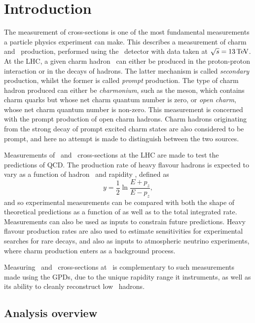 \chapter{Introduction}
\label{chap:prod:introduction}

The measurement of cross-sections is one of the most fundamental measurements a 
particle physics experiment can make.
This  describes a measurement of charm and \ccbar\ 
production, performed using the \lhcb\ detector with data taken at $\sqrts = 
\SI{13}{\TeV}$.
At the \ac{LHC}, a given charm hadron \PHc\ can either be produced in the 
proton-proton interaction or in the decays of \PB hadrons.
The latter mechanism is called \emph{secondary} production, whilst the former is called \emph{prompt} production.
The type of charm hadron produced can either be \emph{charmonium}, such as the 
\PJpsi meson, which contains charm quarks but whose net charm quantum number is 
zero, or \emph{open charm}, whose net charm quantum number is non-zero.
This measurement is concerned with the prompt production of open charm hadrons.
Charm hadrons originating from the strong decay of prompt excited charm states 
are also considered to be prompt, and here no attempt is made to distinguish 
between the two sources.

Measurements of \ccbar\ and \bbbar\ cross-sections at the \ac{LHC} are made to 
test the predictions of \acf{QCD}.
The production rate of heavy flavour hadrons is expected to vary as a function 
of hadron \pT\ and rapidity \rapidity, defined as
\begin{equation}
  y = \frac{1}{2}\ln{\frac{E + p_{z}}{E - p_{z}}},
  \label{eqn:prod:introduction:rapidity}
\end{equation}
and so experimental measurements can be compared with both the shape of 
theoretical predictions as a function of \pTy as well as to the total 
integrated rate.
Measurements can also be used as inputs to constrain future predictions.
Heavy flavour production rates are also used to estimate sensitivities for experimental searches 
for rare decays, and also as inputs to 
atmospheric neutrino experiments, where charm production enters as a background 
process.

Measuring \ccbar\ and \bbbar\ cross-sections at \lhcb\ is complementary to such 
measurements made using the \acp{GPD}, due to the unique rapidity range it 
instruments, as well as its ability to cleanly reconstruct low \pT\ hadrons.

\section{Analysis overview}
\label{chap:prod:introduction:analysis_overview}

